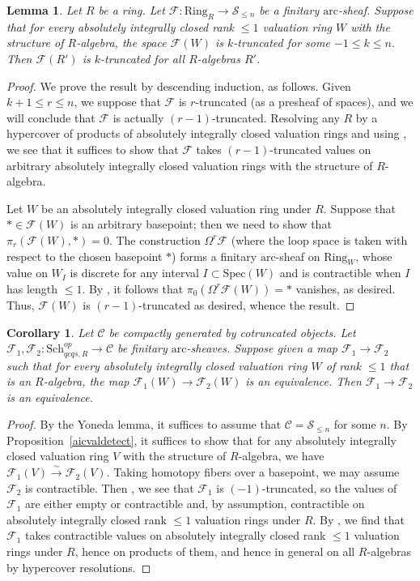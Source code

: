 \documentclass[reqno]{amsart}
\newcommand{\sF}{\mathcal{F}}
\newcommand{\spec}{\mathrm{Spec}}
\newcommand{\arc}{\mathrm{arc}}
\newtheorem{lemma}[theorem]{Lemma}
\newtheorem{corollary}[theorem]{Corollary}
\theoremstyle{definition}
\begin{document}
\begin{lemma} 
Let $R$ be a ring. 
Let $\sF \colon \mathrm{Ring}_R \to \mathcal{S}_{\leq n}$ be a finitary $\arc$-sheaf. 
Suppose that 
for every absolutely integrally closed rank $\leq 1$ valuation ring $W$ with the
structure of $R$-algebra, the space $\sF(W)$ is $k$-truncated for some $-1 \leq k \leq n$. 
Then $\sF(R')$ is $k$-truncated for all $R$-algebras $R'$. 
\label{ntruncatedsheaf2}
\end{lemma} 
\begin{proof} 
We prove the result by descending induction, as follows. 
Given $k + 1 \leq r \leq n$, we suppose that 
$\sF$ is $r$-truncated (as a presheaf of spaces), and we will conclude that
$\sF$ is actually $(r-1)$-truncated.
Resolving any $R$ by a hypercover of products of absolutely integrally
closed valuation rings and using , we see that it
suffices to show that $\sF$ takes $(r-1)$-truncated values
on arbitrary absolutely integrally closed valuation rings with the structure of
$R$-algebra. 


Let $W$ be an absolutely integrally closed valuation ring under $R$. 
Suppose that $\ast \in \sF(W)$ is an arbitrary basepoint; then 
we need to show that $\pi_r( \sF(W), \ast) =0 $. 
The construction 
$\Omega^r \sF $ (where the loop space is taken with respect to the chosen
basepoint $\ast$) forms a finitary $\arc$-sheaf on $\mathrm{Ring}_W$, whose
value on $W_I$ is discrete for any interval $I \subset \spec(W)$ and is contractible
when $I$ has length $\leq 1$. 
By , it follows that $\pi_0(\Omega^r \sF(W)) = \ast$ vanishes, as
desired. 
Thus, $\sF(W)$ is $(r-1)$-truncated as desired, whence the result. 
\end{proof} 

\begin{corollary} 
\label{detectequivfinitaryarc}
Let $\mathcal{C}$ be compactly generated by cotruncated objects. 
Let $\sF_1, \sF_2\colon  \mathrm{Sch}_{qcqs,R}^{op} \to \mathcal{C}$ be finitary
$\arc$-sheaves. 
Suppose given a map $\sF_1 \to \sF_2$ such that for every absolutely integrally closed valuation ring
$W$ of
rank $\leq 1$ that is an $R$-algebra, the map $\sF_1(W) \to \sF_2( W)$ is an
equivalence. Then $\sF_1\to \sF_2$ is an equivalence. 
\end{corollary} 
\begin{proof} 
By the Yoneda lemma, it suffices to assume that $\mathcal{C} = \mathcal{S}_{\leq
n}$ for some $n$. 
By Proposition~\ref{aicvaldetect}, 
it suffices to show that for any absolutely integrally closed valuation ring $V$
with the structure of $R$-algebra,
we have $\sF_1(V) \xrightarrow{\sim} \sF_2(V)$. 
Taking homotopy fibers over a basepoint, we may assume $\sF_2$ is contractible. 
Then , we see that $\sF_1$ 
is $(-1)$-truncated, so the values of $\sF_1$ are either empty or contractible
and, by assumption, contractible on absolutely integrally closed rank $\leq 1$ valuation rings under $R$. 
By , we find that $\sF_1$ takes contractible values on
absolutely integrally closed rank $\leq 1$ valuation rings under $R$, hence on
products of them, and hence in general on all $R$-algebras by hypercover
resolutions. 
\end{proof} 
\end{document}
